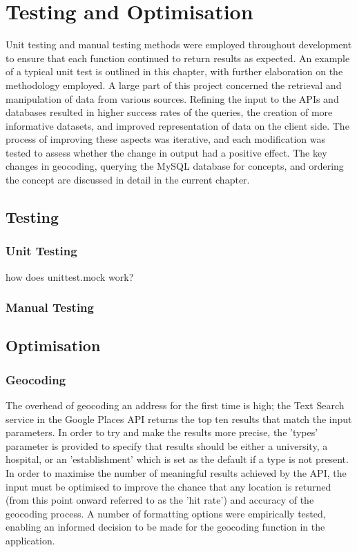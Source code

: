 \documentclass[Report.tex]{subfiles}
\begin{document}
\chapter{Testing and Optimisation}
Unit testing and manual testing methods were employed throughout development to ensure that each function continued to return results as expected. An example of a typical unit test is outlined in this chapter, with further elaboration on the methodology employed. A large part of this project concerned the retrieval and manipulation of data from various sources. Refining the input to the APIs and databases resulted in higher success rates of the queries, the creation of more informative datasets, and improved representation of data on the client side. The process of improving these aspects was iterative, and each modification was tested to assess whether the change in output had a positive effect. The key changes in geocoding, querying the MySQL database for concepts, and ordering the concept are discussed in detail in the current chapter.

\section{Testing}
\subsection{Unit Testing}
how does unittest.mock work?

\subsection{Manual Testing}

\section{Optimisation}
\subsection{Geocoding}
The overhead of geocoding an address for the first time is high; the Text Search service in the Google Places API returns the top ten results that match the input parameters. In order to try and make the results more precise, the 'types' parameter is provided to specify that results should be either a university, a hospital, or an 'establishment' which is set as the default if a type is not present. In order to maximise the number of meaningful results achieved by the API, the input must be optimised to improve the chance that any location is returned (from this point onward referred to as the 'hit rate') and accuracy of the geocoding process. A number of formatting options were empirically tested, enabling an informed decision to be made for the geocoding function in the application.\newline
\end{document}
